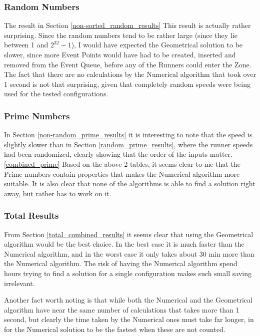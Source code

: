   

\subsubsection{Random Numbers}
The result in Section \ref{non-sorted_random_results} This result is actually rather surprising. Since the random numbers tend to be rather large (since they lie between 1 and $2^{32} - 1$), I would have expected the Geometrical solution to be slower, since more Event Points would have had to be created, inserted and removed from the Event Queue, before any of the Runners could enter the Zone. The fact that there are no calculations by the Numerical algorithm that took over 1 second is not that surprising, given that completely random speeds were being used for the tested configurations.\\

\subsubsection{Prime Numbers}

In Section \ref{non-random_prime_results} it is interesting to note that the speed is slightly slower than in Section \ref{random_prime_results}, where the runner speeds had been randomized, clearly showing that the order of the inputs matter.\\

\ref{combined_prime}
Based on the above 2 tables, it seems clear to me that the Prime numbers contain properties that makes the Numerical algorithm more suitable. It is also clear that none of the algorithms is able to find a solution right away, but rather has to work on it. 


\subsubsection{Total Results}
From Section \ref{total_combined_results} it seems clear that using the Geometrical algorithm would be the best choice. In the best case it is much faster than the Numerical algorithm, and in the worst case it only takes about 30 min more than the Numerical algorithm. The risk of having the Numerical algorithm spend hours trying to find a solution for a single configuration makes such small saving irrelevant.  

Another fact worth noting is that while both the Numerical and the Geometrical algorithm have near the same number of calculations that takes more than 1 second, but clearly the time taken by the Numerical ones must take far longer, in for the Numerical solution to be the fastest when these are not counted.



